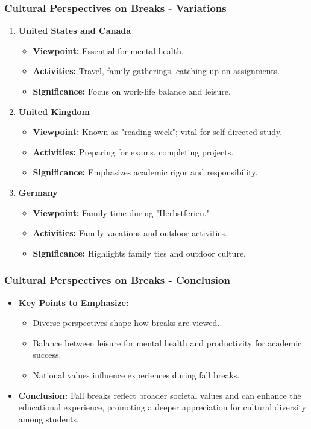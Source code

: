 \documentclass[aspectratio=169]{beamer}
\begin{document}
\begin{frame}[fragile]
    \frametitle{Cultural Perspectives on Breaks - Variations}
    \begin{enumerate}
        \item \textbf{United States and Canada}
            \begin{itemize}
                \item \textbf{Viewpoint:} Essential for mental health.
                \item \textbf{Activities:} Travel, family gatherings, catching up on assignments.
                \item \textbf{Significance:} Focus on work-life balance and leisure.
            \end{itemize}

        \item \textbf{United Kingdom}
            \begin{itemize}
                \item \textbf{Viewpoint:} Known as "reading week"; vital for self-directed study.
                \item \textbf{Activities:} Preparing for exams, completing projects.
                \item \textbf{Significance:} Emphasizes academic rigor and responsibility.
            \end{itemize}

        \item \textbf{Germany}
            \begin{itemize}
                \item \textbf{Viewpoint:} Family time during "Herbstferien."
                \item \textbf{Activities:} Family vacations and outdoor activities.
                \item \textbf{Significance:} Highlights family ties and outdoor culture.
            \end{itemize}
    \end{enumerate}
\end{frame}

\begin{frame}[fragile]
    \frametitle{Cultural Perspectives on Breaks - Conclusion}
    \begin{itemize}
        \item \textbf{Key Points to Emphasize:}
            \begin{itemize}
                \item Diverse perspectives shape how breaks are viewed.
                \item Balance between leisure for mental health and productivity for academic success.
                \item National values influence experiences during fall breaks.
            \end{itemize}
        \item \textbf{Conclusion:} Fall breaks reflect broader societal values and can enhance the educational experience, promoting a deeper appreciation for cultural diversity among students.
    \end{itemize}
\end{frame}
\end{document}
